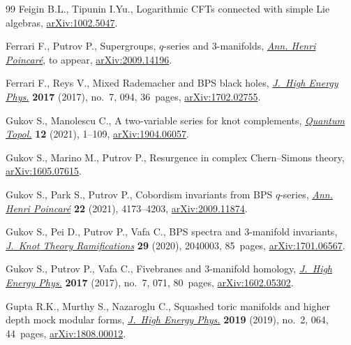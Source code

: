\documentclass[pdftex]{sigma}
\theoremstyle{definition}
\numberwithin{equation}{section}
\begin{document}
\begin{thebibliography}{99}
Feigin B.L., Tipunin I.Yu., Logarithmic {CFT}s connected with simple {L}ie
 algebras, \href{https://arxiv.org/abs/1002.5047}{arXiv:1002.5047}.

Ferrari F., Putrov P., Supergroups, $q$-series and 3-manifolds, \href{https://doi.org/10.1007/s00023-023-01380-4}{\textit{Ann.
 Henri Poincar\'e}}, {t}o appear, \href{https://arxiv.org/abs/2009.14196}{arXiv:2009.14196}.

Ferrari F., Reys V., Mixed {R}ademacher and {BPS} black holes, \href{https://doi.org/10.1007/JHEP07(2017)094}{\textit{J.~High
 Energy Phys.}} \textbf{2017} (2017), no.~7, 094, 36~pages,
 \href{https://arxiv.org/abs/1702.02755}{arXiv:1702.02755}.

Gukov S., Manolescu C., A two-variable series for knot complements,
 \href{https://doi.org/10.4171/qt/145}{\textit{Quantum Topol.}} \textbf{12} (2021), 1--109, \href{https://arxiv.org/abs/1904.06057}{arXiv:1904.06057}.

Gukov S., Marino M., Putrov P., Resurgence in complex {C}hern--{S}imons theory,
 \href{https://arxiv.org/abs/1605.07615}{arXiv:1605.07615}.

Gukov S., Park S., Putrov P., Cobordism invariants from {BPS} {$q$}-series,
 \href{https://doi.org/10.1007/s00023-021-01089-2}{\textit{Ann. Henri Poincar\'e}} \textbf{22} (2021), 4173--4203,
 \href{https://arxiv.org/abs/2009.11874}{arXiv:2009.11874}.

Gukov S., Pei D., Putrov P., Vafa C., B{PS} spectra and 3-manifold invariants,
 \href{https://doi.org/10.1142/S0218216520400039}{\textit{J.~Knot Theory Ramifications}} \textbf{29} (2020), 2040003, 85~pages,
 \href{https://arxiv.org/abs/1701.06567}{arXiv:1701.06567}.

Gukov S., Putrov P., Vafa C., Fivebranes and 3-manifold homology,
 \href{https://doi.org/10.1007/JHEP07(2017)071}{\textit{J.~High Energy Phys.}} \textbf{2017} (2017), no.~7, 071, 80~pages,
 \href{https://arxiv.org/abs/1602.05302}{arXiv:1602.05302}.

Gupta R.K., Murthy S., Nazaroglu C., Squashed toric manifolds and higher depth
 mock modular forms, \href{https://doi.org/10.1007/jhep02(2019)064}{\textit{J.~High Energy Phys.}} \textbf{2019} (2019),
 no.~2, 064, 44~pages, \href{https://arxiv.org/abs/1808.00012}{arXiv:1808.00012}.


\end{thebibliography}
\end{document}
